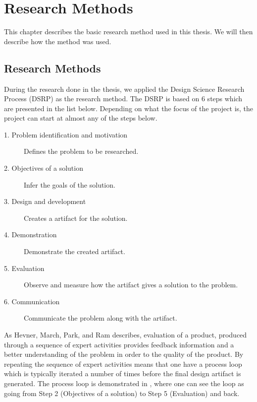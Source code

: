 
\chapter{Research Methods} %
\label{cha:research_questions_and_method}
This chapter describes the basic research method used in this 
thesis. We will then describe how the method was used.
\section{Research Methods} %
\label{sec:research_method}

During the research done in the thesis, we applied the Design Science Research 
Process (DSRP) as the research method. The DSRP is based on 6 steps which are 
presented in the list below. Depending on what the focus of the project is, 
the project can start at almost any of the steps below.\cite{peffers2006design}

\begin{description}
	\item [1. Problem identification and motivation] Defines the problem to be
	researched. 
	\item [2. Objectives of a solution] Infer the goals of the solution.
	\item [3. Design and development] Creates a artifact for the solution.
	\item [4. Demonstration] Demonstrate the created artifact.
	\item [5. Evaluation] Observe and measure how the artifact gives a 
	solution to the problem.
	\item [6. Communication] Communicate the problem along with the artifact.
\end{description}

As Hevner, March, Park, and Ram\cite{von2004design} describes, 
evaluation of a product, produced through a sequence of expert activities 
provides feedback information and a better understanding of the problem in 
order to the quality of the product. By repeating the sequence of expert 
activities means that one have a process loop which is typically iterated a 
number of times before the final design artifact is generated. The process 
loop is demonstrated in , where one can see the loop as going 
from Step 2 (Objectives of a solution) to Step 5 (Evaluation) and back.\\

